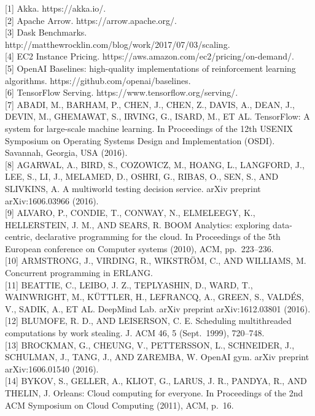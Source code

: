 \documentclass[
]{article}
\begin{document}
{[}1{]} Akka. https://akka.io/.\\
{[}2{]} Apache Arrow. https://arrow.apache.org/.\\
{[}3{]} Dask Benchmarks.
http://matthewrocklin.com/blog/work/2017/07/03/scaling.\\
{[}4{]} EC2 Instance Pricing.
https://aws.amazon.com/ec2/pricing/on-demand/.\\
{[}5{]} OpenAI Baselines: high-quality implementations of reinforcement
learning algorithms. https://github.com/openai/baselines.\\
{[}6{]} TensorFlow Serving. https://www.tensorflow.org/serving/.\\
{[}7{]} ABADI, M., BARHAM, P., CHEN, J., CHEN, Z., DAVIS, A., DEAN, J.,
DEVIN, M., GHEMAWAT, S., IRVING, G., ISARD, M., ET AL. TensorFlow: A
system for large-scale machine learning. In Proceedings of the 12th
USENIX Symposium on Operating Systems Design and Implementation (OSDI).
Savannah, Georgia, USA (2016).\\
{[}8{]} AGARWAL, A., BIRD, S., COZOWICZ, M., HOANG, L., LANGFORD, J.,
LEE, S., LI, J., MELAMED, D., OSHRI, G., RIBAS, O., SEN, S., AND
SLIVKINS, A. A multiworld testing decision service. arXiv preprint
arXiv:1606.03966 (2016).\\
{[}9{]} ALVARO, P., CONDIE, T., CONWAY, N., ELMELEEGY, K., HELLERSTEIN,
J. M., AND SEARS, R. BOOM Analytics: exploring data-centric, declarative
programming for the cloud. In Proceedings of the 5th European conference
on Computer systems (2010), ACM, pp.~223--236.\\
{[}10{]} ARMSTRONG, J., VIRDING, R., WIKSTRÖM, C., AND WILLIAMS, M.
Concurrent programming in ERLANG.\\
{[}11{]} BEATTIE, C., LEIBO, J. Z., TEPLYASHIN, D., WARD, T.,
WAINWRIGHT, M., KÜTTLER, H., LEFRANCQ, A., GREEN, S., VALDÉS, V., SADIK,
A., ET AL. DeepMind Lab. arXiv preprint arXiv:1612.03801 (2016).\\
{[}12{]} BLUMOFE, R. D., AND LEISERSON, C. E. Scheduling multithreaded
computations by work stealing. J. ACM 46, 5 (Sept.~1999), 720--748.\\
{[}13{]} BROCKMAN, G., CHEUNG, V., PETTERSSON, L., SCHNEIDER, J.,
SCHULMAN, J., TANG, J., AND ZAREMBA, W. OpenAI gym. arXiv preprint
arXiv:1606.01540 (2016).\\
{[}14{]} BYKOV, S., GELLER, A., KLIOT, G., LARUS, J. R., PANDYA, R., AND
THELIN, J. Orleans: Cloud computing for everyone. In Proceedings of the
2nd ACM Symposium on Cloud Computing (2011), ACM, p.~16.\\
\end{document}
